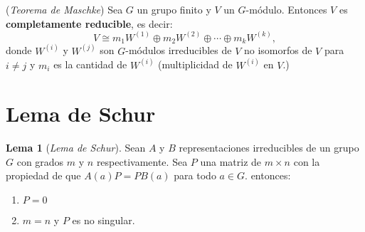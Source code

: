 \documentclass[12pt]{book}
\theoremstyle{definition}
\newtheorem{lemma}[theorem]{Lema}
\newcounter{in}
\newcounter{ini}
\begin{document}
\begin{mdframed}
  (\textit{Teorema de Maschke}) Sea $G$ un grupo finito y $V$ un
  $G$-módulo. Entonces $V$ es \textbf{completamente reducible}, es
  decir:
  \begin{equation}
    \label{eq:95}
    V \cong m_1W^{(1)} \oplus m_2W^{(2)} \oplus  \cdots \oplus m_kW^{(k)}, 
  \end{equation}
  donde $W^{(i)}$ y $W^{(j)}$ son $G$-módulos irreducibles de $V$ no
  isomorfos de $V$ para $i \neq j$ y $m_i$ es la cantidad de $W^{(i)}$
  (multiplicidad de $W^{(i)}$ en $V$.)
\end{mdframed}
\section{Lema de Schur}
\label{sec:schur}

\begin{lemma}[\textit{Lema de Schur}]
  \label{l3_1}
  Sean $A$ y $B$ representaciones
  irreducibles de un grupo $G$ con grados $m$ y $n$ respectivamente. Sea
  $P$ una matriz de $m \times n$ con la propiedad de que $A(a)P=PB(a)$ para
  todo $a \in G$.  entonces:
  \begin{enumerate}
  \item $P=0$
  \item $m=n$ y $P$ es no singular.
  \end{enumerate}
\end{lemma}
\end{document}
